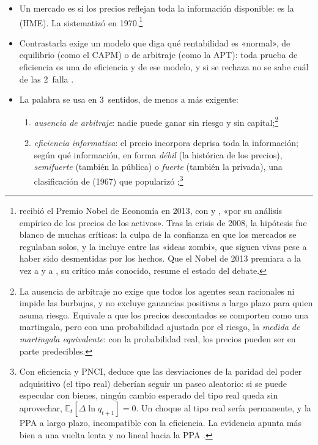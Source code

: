 \documentclass[11pt]{article}
\begin{document}
\begin{itemize}
\item Un mercado es  si los precios reflejan toda la información disponible\nocite{Fama1970Efficient}: es la  (HME). La sistematizó  en 1970.\footnote{ recibió el Premio Nobel de Economía en 2013, con  y , «por su análisis empírico de los precios de los activos»\nocite{Nobel2013Fama}. Tras la crisis de 2008, la hipótesis fue blanco de muchas críticas: \textcite{Fox2009Myth} la culpa de la confianza en que los mercados se regulaban solos, y \textcite{Quiggin2010Zombie} la incluye entre las «ideas zombi», que siguen vivas pese a haber sido desmentidas por los hechos. Que el Nobel de 2013 premiara a la vez a  y a , su crítico más conocido, resume el estado del debate.}
\item Contrastarla exige un modelo que diga qué rentabilidad es «normal», de equilibrio (como el CAPM) o de arbitraje (como la APT): toda prueba de eficiencia es una  de eficiencia y de ese modelo, y si se rechaza no se sabe cuál de las 2~falla\nocite{Fama2014Two} .
\item La palabra se usa en 3~sentidos, de menos a más exigente\nocite{Duffie2001Dynamic}:
  \begin{enumerate}
  \item \emph{ausencia de arbitraje}: nadie puede ganar sin riesgo y sin capital;\footnote{La ausencia de arbitraje no exige que todos los agentes sean racionales ni impide las burbujas, y no excluye ganancias positivas a largo plazo para quien asuma riesgo. Equivale a que los precios descontados se comporten como una martingala, pero con una probabilidad ajustada por el riesgo, la \emph{medida de martingala equivalente}\nocite{HarrisonKreps1979}: con la probabilidad real, los precios pueden ser en parte predecibles.}
  \item \emph{eficiencia informativa}: el precio incorpora deprisa toda la información; según qué información, en forma \emph{débil} (la histórica de los precios), \emph{semifuerte} (también la pública) o \emph{fuerte} (también la privada), una clasificación de  (1967) que popularizó \textcite{Fama1970Efficient};\footnote{Con eficiencia y PNCI, \textcite{Roll1979PPP} deduce que las desviaciones de la paridad del poder adquisitivo (el tipo real) deberían seguir un paseo aleatorio: si se puede especular con bienes, ningún cambio esperado del tipo real queda sin aprovechar, $\mathbb{E}_t[\Delta\ln q_{t+1}]=0$. Un choque al tipo real sería permanente, y la PPA a largo plazo, incompatible con la eficiencia. La evidencia apunta más bien a una vuelta lenta y no lineal hacia la PPA\nocite{SarnoTaylor2002Economics} .}

\end{enumerate}
\end{itemize}
\end{document}
